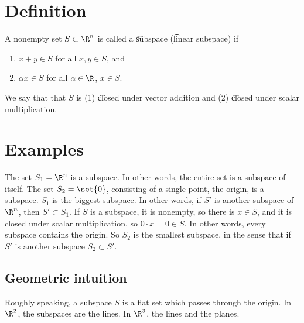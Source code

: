 
\section*{Definition}

A nonempty set $S \subset \R ^n$ is called a \t{subspace} (\t{linear subspace}) if
  \begin{enumerate}
  \item $x + y \in S$ for all $x, y \in S$, and
  \item $\alpha x \in S$ for all $\alpha  \in \R $, $x \in S$.
  \end{enumerate}
We say that that $S$ is (1) \t{closed under vector addition} and (2) \t{closed under scalar multiplication}.

\section*{Examples}

The set $S_1 = \R ^n$ is a subspace. In other words, the entire set is a subspace of itself.
The set $S_2 = \set{0}$, consisting of a single point, the origin, is a subspace.
$S_1$ is the biggest subspace.
In other words, if $S'$ is another subspace of $\R ^n$, then $S' \subset S_1$.
If $S$ is a subspace, it is nonempty, so there is $x \in S$, and it is closed under scalar multiplication, so $0\cdot x = 0 \in S$.
In other words, every subspace contains the origin.
So $S_2$ is the smallest subspace, in the sense that if $S'$ is another subspace $S_2 \subset S'$.

\subsection*{Geometric intuition}

Roughly speaking, a subspace $S$ is a flat set which passes through the origin.
In $\R ^2$, the subspaces are the lines.
In $\R ^3$, the lines and the planes.

\blankpage